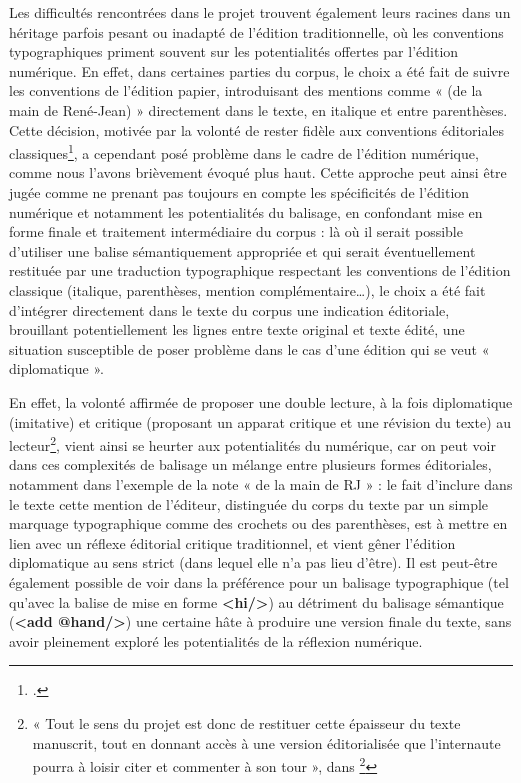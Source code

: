 Les difficultés rencontrées dans le projet \pense trouvent également leurs racines dans un héritage parfois pesant ou inadapté de l’édition traditionnelle, où les conventions typographiques priment souvent sur les potentialités offertes par l’édition numérique. En effet, dans certaines parties du corpus, le choix a été fait de suivre les conventions de l’édition papier, introduisant des mentions comme « (de la main de René-Jean) » directement dans le texte, en italique et entre parenthèses. Cette décision, motivée par la volonté de rester fidèle aux conventions éditoriales classiques\footcite{nougaret_ledition_2015}, a cependant posé problème dans le cadre de l’édition numérique, comme nous l’avons brièvement évoqué plus haut. 
Cette approche peut ainsi être jugée comme ne prenant pas toujours en compte les spécificités de l’édition numérique et notamment les potentialités du balisage, en confondant mise en forme finale et traitement intermédiaire du corpus : là où il serait possible d’utiliser une balise \tei sémantiquement appropriée et qui serait éventuellement restituée par une traduction typographique  respectant les conventions de l’édition classique (italique, parenthèses, mention complémentaire…), le choix a été fait d’intégrer directement dans le texte du corpus une indication éditoriale, brouillant potentiellement les lignes entre texte original et texte édité, une situation susceptible de poser problème dans le cas d’une édition qui se veut « diplomatique ».

En effet, la volonté affirmée de proposer une double lecture, à la fois diplomatique (imitative) et critique (proposant un apparat critique et une révision du texte) au lecteur\footnote{« Tout le sens du projet \pense est donc de restituer cette épaisseur du texte manuscrit, tout en donnant accès à une version éditorialisée que l’internaute pourra à loisir citer et commenter à son tour », dans \footcite[p.2]{carius_principes_2024}}, vient ainsi se heurter aux potentialités du numérique, car on peut voir dans ces complexités de balisage un mélange entre plusieurs formes éditoriales, notamment dans l’exemple de la note « de la main de RJ » : le fait d’inclure dans le texte cette mention de l’éditeur, distinguée du corps du texte par un simple marquage typographique comme des crochets ou des parenthèses, est à mettre en lien avec un réflexe éditorial critique traditionnel, et vient gêner l’édition diplomatique au sens strict (dans lequel elle n’a pas lieu d’être). 
Il est peut-être également possible de voir dans la préférence pour un balisage typographique (tel qu’avec la balise de mise en forme \textbf{<hi/>}) au détriment du balisage sémantique (\textbf{<add @hand/>}) une certaine hâte à produire une version finale du texte, sans avoir pleinement exploré les potentialités de la réflexion numérique. 

